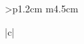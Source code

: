 \begin{tabular}{>{\bfseries}p{1.2cm} m{4.5cm}}
\begin{tabular}[t]{|c|}
\begin{longtable}
\begin{scriptexample}{}{}
\begin{comment}
\topline
\begin{center}
\begin{tabular}{c@{\qquad\qquad\qquad}c}
\small
  \begin{tabular}[t]{r@{\;}c@{\;}l}
      1 & = & I\\
      2 & = & II\\
      3 & = & III\\
      4 & = & IV\\
      5 & = & V\\
      6 & = & VI\\
      7 & = & VII\\
      8 & = & VIII\\
      9 & = & IX\\
     10 & = & X\\
     20 & = & XX\\
     30 & = & XXX\\
     40 & = & XL\\
     50 & = & L\\
     60 & = & LX\\
     70 & = & LXX\\
     80 & = & LXXX\\
     90 & = & XC\\
    100 & = & C
  \end{tabular}&
  \begin{tabular}[t]{r@{\;}c@{\;}l}
          500 & = & D or L\nbrotC\\
        1,000 & = & M or C\nbrotC\\
        2,000 & = & MM or II\nbrotC\nbrotC\nbrotC\\
        5,000 & = & $\overline{\text{V}}$ or L\nbrotC\nbrotC\\
        6,000 & = & $\overline{\text{VI}}$ or LX\nbrotC\nbrotC\\ %
       10,000 & = & $\overline{\text{X}}$ or C\nbrotC\nbrotC\\
       50,000 & = & $\overline{\text{L}}$ or L\nbrotC\nbrotC\nbrotC\\
       60,000 & = & $\overline{\text{LX}}$ or LX\nbrotC\nbrotC\nbrotC\\ %
      100,000 & = & $\overline{\text{C}}$ or C\nbrotC\nbrotC\nbrotC\\
    1,000,000 & = & $\overline{\text{M}}$ or C\nbrotC\nbrotC\nbrotC\nbrotC\\
    2,000,000 & = & $\overline{\text{MM}}$ or MM\nbrotC\nbrotC\nbrotC\\[1ex]
    \multicolumn{3}{c}{\parbox{14em}{When a line is drawn over a number it means that its value is increased 1000 times.}}
  \end{tabular}
\end{tabular}
\end{center}
\captionof{table}{Roman numerals}
\label{tbl:romannumerals}
\bottomline
\medskip


\end{comment}
\end{scriptexample}
\end{longtable}
\end{tabular}
\end{tabular}
